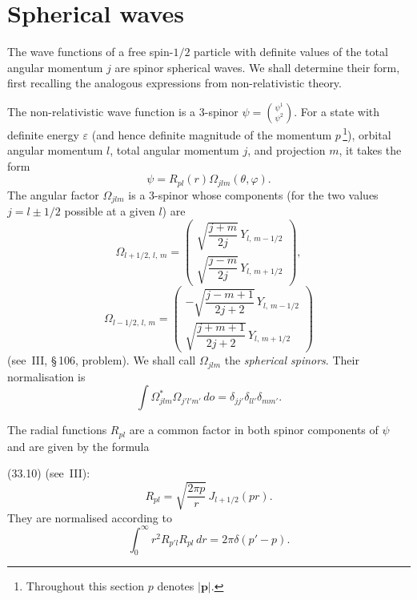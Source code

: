 \section{Spherical waves}

The wave functions of a free spin-$1/2$ particle with definite values of the total angular momentum $j$ are spinor spherical waves. We shall determine their form, first recalling the analogous expressions from non-relativistic theory.

The non-relativistic wave function is a 3-spinor $\psi = \binom{\psi^1}{\psi^2}$. For a state with definite energy $\varepsilon$ (and hence definite magnitude of the momentum $p$\,\footnote{Throughout this section $p$ denotes $|\mathbf{p}|$.}), orbital angular momentum $l$, total angular momentum $j$, and projection $m$, it takes the form
\begin{equation}
\psi = R_{pl}(r)\Omega_{jlm}(\theta, \varphi).
\tag{24.1}
\end{equation}
The angular factor $\Omega_{jlm}$ is a 3-spinor whose components (for the two values $j = l \pm 1/2$ possible at a given $l$) are
\begin{equation}
\Omega_{l+1/2,\,l,\,m} = \begin{pmatrix} \sqrt{\dfrac{j+m}{2j}}\,Y_{l,\,m-1/2}\\[6pt] \sqrt{\dfrac{j-m}{2j}}\,Y_{l,\,m+1/2} \end{pmatrix},
\tag{24.2}
\end{equation}
\[
\Omega_{l-1/2,\,l,\,m} = \begin{pmatrix} -\sqrt{\dfrac{j-m+1}{2j+2}}\,Y_{l,\,m-1/2}\\[6pt] \sqrt{\dfrac{j+m+1}{2j+2}}\,Y_{l,\,m+1/2} \end{pmatrix}
\]
(see~III, \S\,106, problem). We shall call $\Omega_{jlm}$ the \emph{spherical spinors}. Their normalisation is
\begin{equation}
\int \Omega^*_{jlm}\Omega_{j'l'm'}\,do = \delta_{jj'}\delta_{ll'}\delta_{mm'}.
\tag{24.3}
\end{equation}

The radial functions $R_{pl}$ are a common factor in both spinor components of $\psi$ and are given by the formula

(33.10) (see~III):
\begin{equation}
R_{pl} = \sqrt{\frac{2\pi p}{r}}\,J_{l+1/2}(pr).
\tag{24.4}
\end{equation}
They are normalised according to
\begin{equation}
\int_0^\infty r^2 R_{p'l}R_{pl}\,dr = 2\pi\delta(p' - p).
\tag{24.5}
\end{equation}

